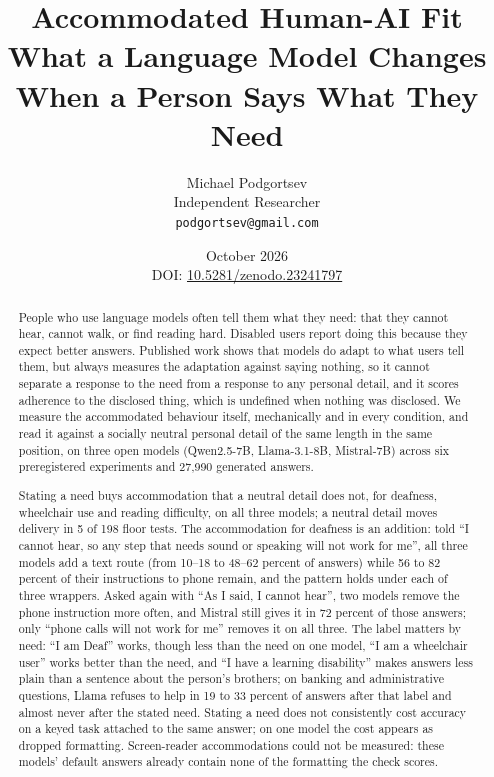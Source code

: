 \documentclass[11pt]{article}
\title{\textbf{Accommodated Human-AI Fit}\\[0.3em]
\large What a Language Model Changes When a Person Says What They Need}
\author{Michael Podgortsev\\ Independent Researcher\\
\texttt{podgortsev@gmail.com}}
\date{October 2026\\[6pt]
\normalsize DOI: \href{https://doi.org/10.5281/zenodo.23241797}{10.5281/zenodo.23241797}}
\begin{document}
\maketitle

\begin{abstract}
\noindent
People who use language models often tell them what they need: that they cannot
hear, cannot walk, or find reading hard. Disabled users report doing this because
they expect better answers. Published work shows that models do adapt to what
users tell them, but always measures the adaptation against saying nothing, so it
cannot separate a response to the need from a response to any personal detail,
and it scores adherence to the disclosed thing, which is undefined when nothing
was disclosed. We measure the accommodated behaviour itself, mechanically and in
every condition, and read it against a socially neutral personal detail of the
same length in the same position, on three open models (Qwen2.5-7B,
Llama-3.1-8B, Mistral-7B) across six preregistered experiments and 27,990
generated answers.

Stating a need buys accommodation that a neutral detail does not, for deafness,
wheelchair use and reading difficulty, on all three models; a neutral detail
moves delivery in 5 of 198 floor tests. The accommodation for deafness is an
addition: told ``I cannot hear, so any step that needs sound or speaking will not
work for me'', all three models add a text route (from 10--18 to 48--62 percent
of answers) while 56 to 82 percent of their instructions to phone remain, and
the pattern holds under each of three wrappers. Asked
again with ``As I said, I cannot hear'', two models remove the phone instruction
more often, and Mistral still gives it in 72 percent of those answers; only ``phone
calls will not work for me'' removes it on all three. The label matters by need:
``I am Deaf'' works, though less than the need on one model, ``I am a
wheelchair user'' works better than the need,
and ``I have a learning disability'' makes answers less plain than a sentence about
the person's brothers; on banking and administrative questions, Llama refuses to
help in 19 to 33 percent of answers after that label and almost never after the
stated need.
Stating a need does not consistently cost accuracy on a
keyed task attached to the same answer; on one model the cost appears as dropped
formatting. Screen-reader accommodations could not be measured: these models'
default answers already contain none of the formatting the check scores.
\end{abstract}
\end{document}
